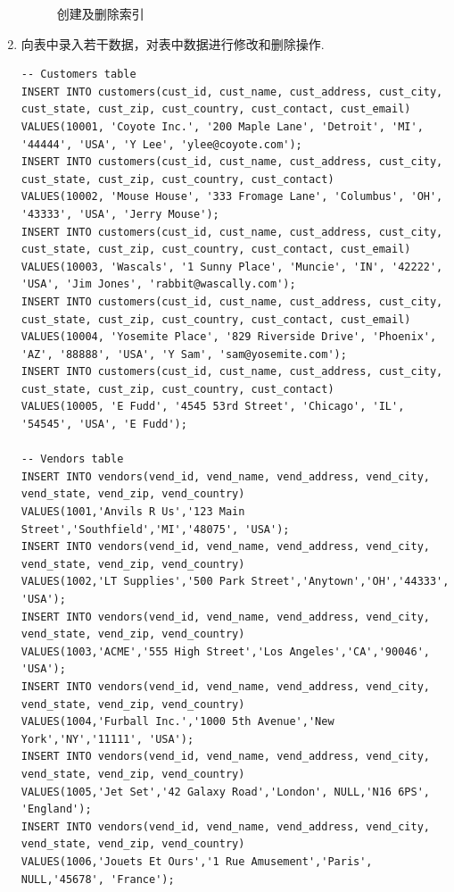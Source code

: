 \begin{enumerate}
\begin{figure}[H]
\begin{center}
  \end{center}
  \caption{创建及删除索引}
\end{figure}
  \item 向表中录入若干数据，对表中数据进行修改和删除操作.
\begin{center}
\begin{verbatim}
-- Customers table
INSERT INTO customers(cust_id, cust_name, cust_address, cust_city, cust_state, cust_zip, cust_country, cust_contact, cust_email)
VALUES(10001, 'Coyote Inc.', '200 Maple Lane', 'Detroit', 'MI', '44444', 'USA', 'Y Lee', 'ylee@coyote.com');
INSERT INTO customers(cust_id, cust_name, cust_address, cust_city, cust_state, cust_zip, cust_country, cust_contact)
VALUES(10002, 'Mouse House', '333 Fromage Lane', 'Columbus', 'OH', '43333', 'USA', 'Jerry Mouse');
INSERT INTO customers(cust_id, cust_name, cust_address, cust_city, cust_state, cust_zip, cust_country, cust_contact, cust_email)
VALUES(10003, 'Wascals', '1 Sunny Place', 'Muncie', 'IN', '42222', 'USA', 'Jim Jones', 'rabbit@wascally.com');
INSERT INTO customers(cust_id, cust_name, cust_address, cust_city, cust_state, cust_zip, cust_country, cust_contact, cust_email)
VALUES(10004, 'Yosemite Place', '829 Riverside Drive', 'Phoenix', 'AZ', '88888', 'USA', 'Y Sam', 'sam@yosemite.com');
INSERT INTO customers(cust_id, cust_name, cust_address, cust_city, cust_state, cust_zip, cust_country, cust_contact)
VALUES(10005, 'E Fudd', '4545 53rd Street', 'Chicago', 'IL', '54545', 'USA', 'E Fudd');

-- Vendors table
INSERT INTO vendors(vend_id, vend_name, vend_address, vend_city, vend_state, vend_zip, vend_country)
VALUES(1001,'Anvils R Us','123 Main Street','Southfield','MI','48075', 'USA');
INSERT INTO vendors(vend_id, vend_name, vend_address, vend_city, vend_state, vend_zip, vend_country)
VALUES(1002,'LT Supplies','500 Park Street','Anytown','OH','44333', 'USA');
INSERT INTO vendors(vend_id, vend_name, vend_address, vend_city, vend_state, vend_zip, vend_country)
VALUES(1003,'ACME','555 High Street','Los Angeles','CA','90046', 'USA');
INSERT INTO vendors(vend_id, vend_name, vend_address, vend_city, vend_state, vend_zip, vend_country)
VALUES(1004,'Furball Inc.','1000 5th Avenue','New York','NY','11111', 'USA');
INSERT INTO vendors(vend_id, vend_name, vend_address, vend_city, vend_state, vend_zip, vend_country)
VALUES(1005,'Jet Set','42 Galaxy Road','London', NULL,'N16 6PS', 'England');
INSERT INTO vendors(vend_id, vend_name, vend_address, vend_city, vend_state, vend_zip, vend_country)
VALUES(1006,'Jouets Et Ours','1 Rue Amusement','Paris', NULL,'45678', 'France');


\end{verbatim}
\end{center}
\end{enumerate}

